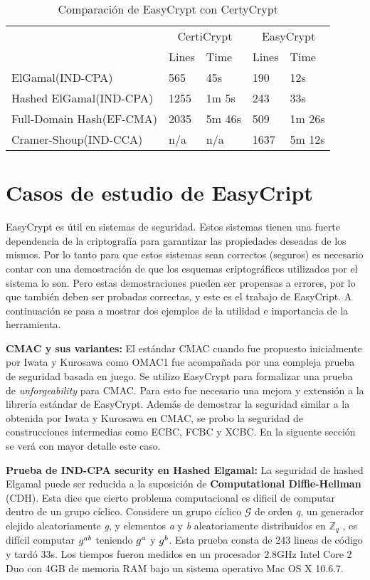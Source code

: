 \documentclass[runningheads]{llncs}
\begin{document}
\begin{table}[H]
  \caption{Comparación de EasyCrypt con CertyCrypt}
  \label{tab:simple}
  \centering
  \begin{tabular}{ |p{3cm}|p{3cm}|p{3cm}|p{3cm}|p{3cm}|  }
 \hline
 & \multicolumn{2}{|c|}{CertiCrypt} & \multicolumn{2}{|c|}{EasyCrypt} \\\cline{2-5}

 &Lines&Time&Lines&Time\\\cline{2-5}
 \hline
 ElGamal(IND-CPA)   & 565    &45s &190 &12s \\
 Hashed ElGamal(IND-CPA)& 1255  & 1m 5s & 243  & 33s\\
 Full-Domain Hash(EF-CMA) &2035 & 5m 46s&  509 & 1m 26s\\
 Cramer-Shoup(IND-CCA)    &n/a & n/a& 1637 &5m 12s\\
 \hline
\end{tabular}
\end{table}



\section{Casos de estudio de EasyCript}
EasyCrypt es útil en sistemas de seguridad. Estos sistemas tienen una fuerte dependencia de la criptografía para garantizar las propiedades deseadas de los mismos. Por lo tanto para que estos sistemas sean correctos (seguros) es necesario contar con una demostración de que los esquemas criptográficos utilizados por el sistema lo son. Pero estas demostraciones pueden ser propensas a errores, por lo que también deben ser probadas correctas, y este es el trabajo de EasyCript. A continuación se pasa a mostrar dos ejemplos de la utilidad e importancia de la herramienta.

\textbf{CMAC y sus variantes\cite{ref_article5}:}
El estándar CMAC cuando fue propuesto inicialmente por Iwata y Kurosawa como OMAC1 fue acompañada por una compleja prueba de seguridad basada en juego. Se utilizo EasyCrypt para formalizar una prueba de \textit{unforgeability} para CMAC. Para esto fue necesario una mejora y extensión a la librería estándar de EasyCrypt. Además de demostrar la seguridad similar a la obtenida por Iwata y Kurosawa\cite{ref_article6} en CMAC, se probo la seguridad de construcciones intermedias como ECBC, FCBC y XCBC\cite{ref_article7}. En la siguente sección se verá con mayor detalle este caso.

\textbf{Prueba de \textbf{IND-CPA security} en Hashed Elgamal\cite{ref_article8}:}
La seguridad de hashed Elgamal puede ser reducida a la suposición de \textbf{Computational Diffie-Hellman} (CDH). Esta dice que cierto problema computacional es dificil de computar dentro de un grupo cíclico. Considere un grupo cíclico $\mathcal{G}$ de orden \textit{q}, un generador elejido aleatoriamente \textit{g}, y elementos \textit{a} y \textit{b} aleatoriamente distribuidos en $\mathbb{Z}_q$ , es difícil computar $\mathnormal{g^{ab}}$ teniendo $\mathnormal{g^{a}}$ y $\mathnormal{g^{b}}$. Esta prueba consta de 243 lineas de código y tardó 33s. Los tiempos fueron medidos en un procesador 2.8GHz Intel Core 2 Duo con 4GB de memoria RAM bajo un sistema operativo Mac OS X 10.6.7.
\end{document}
